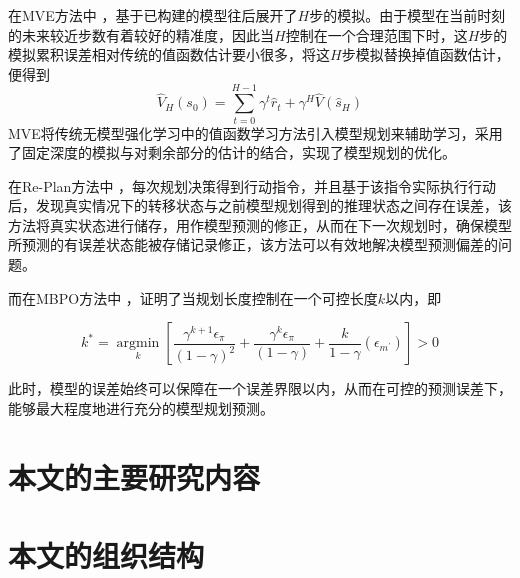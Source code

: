 在MVE方法中 \cite{feinberg2018model}，基于已构建的模型往后展开了$H$步的模拟。由于模型在当前时刻的未来较近步数有着较好的精准度，因此当$H$控制在一个合理范围下时，这$H$步的模拟累积误差相对传统的值函数估计要小很多，将这$H$步模拟替换掉值函数估计，便得到
\begin{equation}
    \hat{V}_{H}\left(s_{0}\right)=\sum_{t=0}^{H-1} \gamma^{t} \hat{r}_{t}+\gamma^{H} \hat{V}\left(\hat{s}_{H}\right)
\end{equation}
MVE将传统无模型强化学习中的值函数学习方法引入模型规划来辅助学习，采用了固定深度的模拟与对剩余部分的估计的结合，实现了模型规划的优化。

在Re-Plan方法中 \cite{williams2017information}，每次规划决策得到行动指令，并且基于该指令实际执行行动后，发现真实情况下的转移状态与之前模型规划得到的推理状态之间存在误差，该方法将真实状态进行储存，用作模型预测的修正，从而在下一次规划时，确保模型所预测的有误差状态能被存储记录修正，该方法可以有效地解决模型预测偏差的问题。

而在MBPO方法中 \cite{janner2019trust}，证明了当规划长度控制在一个可控长度$k$以内，即

\begin{equation}
k^{*}=\underset{k}{\operatorname{argmin}}\left[\frac{\gamma^{k+1} \epsilon_{\pi}}{(1-\gamma)^{2}}+\frac{\gamma^{k} \epsilon_{\pi}}{(1-\gamma)}+\frac{k}{1-\gamma}\left(\epsilon_{m^{\prime}}\right)\right]>0
\end{equation}

此时，模型的误差始终可以保障在一个误差界限以内，从而在可控的预测误差下，能够最大程度地进行充分的模型规划预测。


\section{本文的主要研究内容}

\section{本文的组织结构}